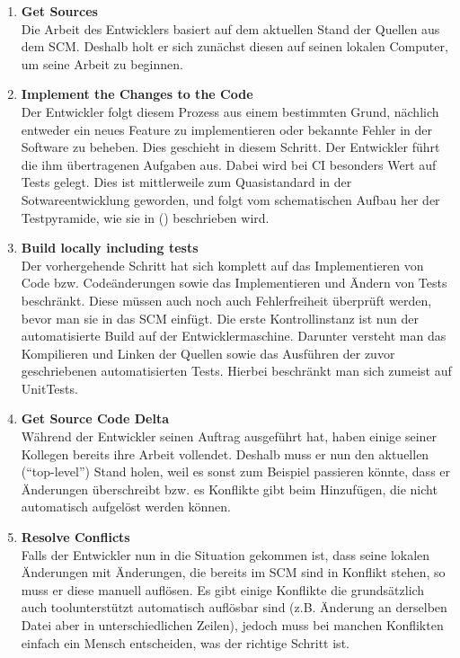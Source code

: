 \begin{enumerate}
	\item \textbf{Get Sources}\\%
		Die Arbeit des Entwicklers basiert auf dem aktuellen Stand der Quellen aus dem SCM. Deshalb holt er sich zunächst diesen auf seinen lokalen Computer, um seine Arbeit zu beginnen.
		\item \textbf{Implement the Changes to the Code}\\%
		Der Entwickler folgt diesem Prozess aus einem bestimmten Grund, nächlich entweder ein neues Feature zu implementieren oder bekannte Fehler in der Software zu beheben. Dies geschieht in diesem Schritt. Der Entwickler führt die ihm übertragenen Aufgaben aus. Dabei wird bei CI besonders Wert auf Tests gelegt. Dies ist mittlerweile zum Quasistandard in der Sotwareentwicklung geworden, und folgt vom schematischen Aufbau her der Testpyramide, wie sie in (\cite{fowler-Testpyramid}) beschrieben wird.
		\item \textbf{Build locally including tests}\\%
		Der vorhergehende Schritt hat sich komplett auf das Implementieren von Code bzw. Codeänderungen sowie das Implementieren und Ändern von Tests beschränkt. Diese müssen auch noch auch Fehlerfreiheit überprüft werden, bevor man sie in das SCM einfügt. Die erste Kontrollinstanz ist nun der automatisierte Build auf der Entwicklermaschine. Darunter versteht man das Kompilieren und Linken der Quellen sowie das Ausführen der zuvor geschriebenen automatisierten Tests. Hierbei beschränkt man sich zumeist auf UnitTests.
		\item \textbf{Get Source Code Delta}\\%
		Während der Entwickler seinen Auftrag ausgeführt hat, haben einige seiner Kollegen bereits ihre Arbeit vollendet. Deshalb muss er nun den aktuellen ("`top-level"') Stand holen, weil es sonst zum Beispiel passieren könnte, dass er Änderungen überschreibt bzw. es Konflikte gibt beim Hinzufügen, die nicht automatisch aufgelöst werden können.
		\item \textbf{Resolve Conflicts}\\%
		Falls der Entwickler nun in die Situation gekommen ist, dass seine lokalen Änderungen mit Änderungen, die bereits im SCM sind in Konflikt stehen, so muss er diese manuell auflösen. Es gibt einige Konflikte die grundsätzlich auch toolunterstützt automatisch auflösbar sind (z.B. Änderung an derselben Datei aber in unterschiedlichen Zeilen), jedoch muss bei manchen Konflikten einfach ein Mensch entscheiden, was der richtige Schritt ist.

\end{enumerate}
